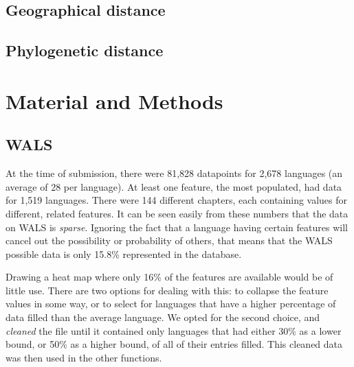 \documentclass[11pt]{article}
\begin{document}
\subsection{Geographical distance}
\subsection{Phylogenetic distance}


\section{Material and Methods}
\subsection{WALS}
At the time of submission, there were 81,828 datapoints for 2,678 languages (an average of 28 per language). At least one feature, the most populated, had data for 1,519 languages. There were 144 different chapters, each containing values for different, related features. It can be seen easily from these numbers that the data on WALS is \emph{sparse}. Ignoring the fact that a language having certain features will cancel out the possibility or probability of others, that means that the WALS possible data is only 15.8\% represented in the database.

Drawing a heat map where only 16\% of the features are available would be of little use. There are two options for dealing with this: to collapse the feature values in some way, or to select for languages that have a higher percentage of data filled than the average language. We opted for the second choice, and \emph{cleaned}  the file until it contained only languages that had either 30\% as a lower bound, or 50\% as a higher bound, of all of their entries filled. This cleaned data was then used in the other functions.  

	
\end{document}
